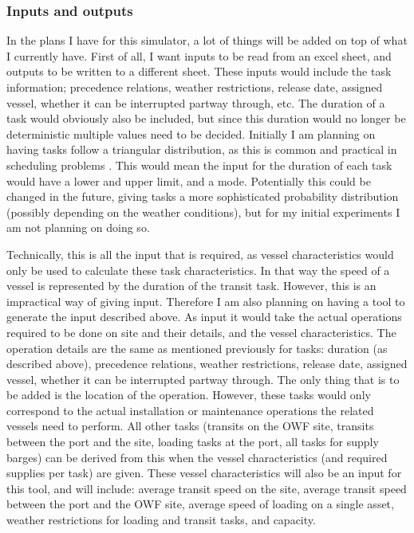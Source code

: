 \documentclass[a4paper,12pt]{article}
\begin{document}
\subsubsection{Inputs and outputs} \label{sss:inou}
In the plans I have for this simulator, a lot of things will be added on top of what I currently have. First of all, I want inputs to be read from an excel sheet, and outputs to be written to a different sheet. These inputs would include the task information; precedence relations, weather restrictions, release date, assigned vessel, whether it can be interrupted partway through, etc.  The duration of a task would obviously also be included, but since this duration would no longer be deterministic multiple values need to be decided. Initially I am planning on having tasks follow a triangular distribution, as this is common and practical in scheduling problems \cite{williams1992practical}. This would mean the input for the duration of each task would have a lower and upper limit, and a mode. Potentially this could be changed in the future, giving tasks a more sophisticated probability distribution (possibly depending on the weather conditions), but for my initial experiments I am not planning on doing so.

Technically, this is all the input that is required, as vessel characteristics would only be used to calculate these task characteristics. In that way the speed of a vessel is represented by the duration of the transit task. However, this is an impractical way of giving input. Therefore I am also planning on having a tool to generate the input described above. As input it would take the actual operations required to be done on site and their details, and the vessel characteristics. The operation details are the same as mentioned previously for tasks: duration (as described above), precedence relations, weather restrictions, release date, assigned vessel, whether it can be interrupted partway through. The only thing that is to be added is the location of the operation. However, these tasks would only correspond to the actual installation or maintenance operations the related vessels need to perform. All other tasks (transits on the OWF site, transits between the port and the site, loading tasks at the port, all tasks for supply barges) can be derived from this when the vessel characteristics (and required supplies per task) are given. These vessel characteristics will also be an input for this tool, and will include: average transit speed on the site, average transit speed between the port and the OWF site, average speed of loading on a single asset, weather restrictions for loading and transit tasks, and capacity. 
\end{document}
